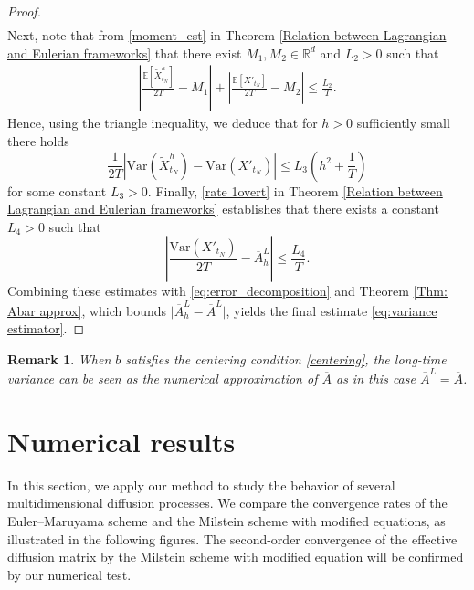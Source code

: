 \documentclass[12pt,a4paper,reqno]{amsart}
\newtheorem{remark}{Remark}[section]
\numberwithin{equation}{section}
\begin{document}
\begin{proof}
\begin{align*}
\end{align*}
    Next, note that from \eqref{moment_est} in Theorem \ref{Relation between Lagrangian and Eulerian frameworks} that there exist $M_1,M_2\in \mathbb{R}^d$ and $L_2>0$ such that
\begin{equation*}
\begin{aligned}\left\lvert
\frac{\mathbb{E}\left[\tilde{X}^h_{t_N}\right]}{2T} - M_1\right\rvert + \left\lvert\frac{\mathbb{E}\left[X'_{t_N}\right]}{2T}  - M_2\right\rvert \le \frac{L_2}{T}.
\end{aligned}
\end{equation*}
Hence, using the triangle inequality, we deduce that for $h>0$ sufficiently small there holds
\begin{equation*}
\frac{1}{2T} \left\lvert \mathrm{Var}(\tilde{X}_{t_N}^h) - \mathrm{Var}(X'_{t_N}) \right\rvert \leq L_3 \left(h^2 + \frac{1}{T}\right)
\end{equation*}
for some constant $L_3>0$. Finally, \eqref{rate 1overt} in Theorem \ref{Relation between Lagrangian and Eulerian frameworks} establishes that there exists a constant $L_4>0$ such that
    \begin{equation*}
        \left\lvert \frac{\mathrm{Var}(X'_{t_N})}{2T} - \overline{A}_h^L\right\rvert \leq \frac{L_4}{T}.
    \end{equation*}
    Combining these estimates with \eqref{eq:error_decomposition} and Theorem \ref{Thm: Abar approx}, which bounds $\lvert \overline{A}_h^L - \overline{A}^L\rvert$, yields the final estimate \eqref{eq:variance estimator}.
    \end{proof}

\begin{remark}
When $b$ satisfies the centering condition \eqref{centering}, the long-time variance can be seen as the numerical approximation of $\overline{A}$ as in this case $\overline{A}^L = \overline{A}$.
\end{remark}


\section{Numerical results}
\noindent
In this section, we apply our method to study the behavior of several multidimensional diffusion processes. We compare the convergence rates of the Euler--Maruyama scheme and the Milstein scheme with modified equations, as illustrated in the following figures. 
The second-order convergence of the effective diffusion matrix by the Milstein scheme with modified equation will be confirmed by our numerical test. 
\end{document}
